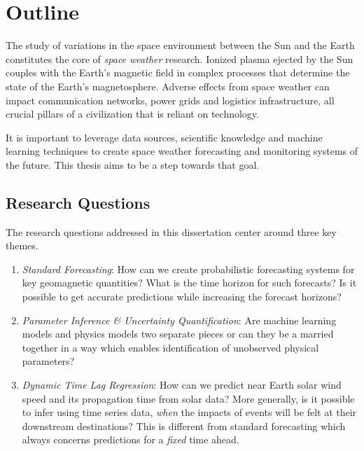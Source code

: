 \chapter{Outline}\label{chapter:Outline}

The study of variations in the space environment between the Sun and the Earth constitutes 
the core of \textit{space weather} research. Ionized plasma ejected by the Sun couples with 
the Earth’s magnetic field in complex processes that determine the state of the Earth's 
magnetosphere. Adverse effects from space weather can impact communication networks, 
power grids and logistics infrastructure, all crucial pillars of a civilization that 
is reliant on technology.

It is important to leverage data sources, scientific knowledge and machine learning 
techniques to create space weather forecasting and monitoring systems of the future. This 
thesis aims to be a step towards that goal. 

\section{Research Questions}

The research questions addressed in this dissertation center around three key themes.

\begin{enumerate}
    \item \textit{Standard Forecasting}: How can we create probabilistic forecasting systems 
    for key geomagnetic quantities? What is the time horizon for such forecasts? Is it possible 
    to get accurate predictions while increasing the forecast horizons?
    
    \item \textit{Parameter Inference \& Uncertainty Quantification}: Are machine learning models 
    and physics models two separate pieces or can they be a married together in a way which enables 
    identification of unobserved physical parameters?  
    
    \item \textit{Dynamic Time Lag Regression}: How can we predict near Earth solar wind speed 
    and its propagation time from solar data? More generally, is it possible to infer using time series 
    data, \emph{when} the impacts of events will be felt at their downstream destinations? This is different 
    from standard forecasting which always concerns predictions for a \emph{fixed} time ahead.
\end{enumerate}
    
